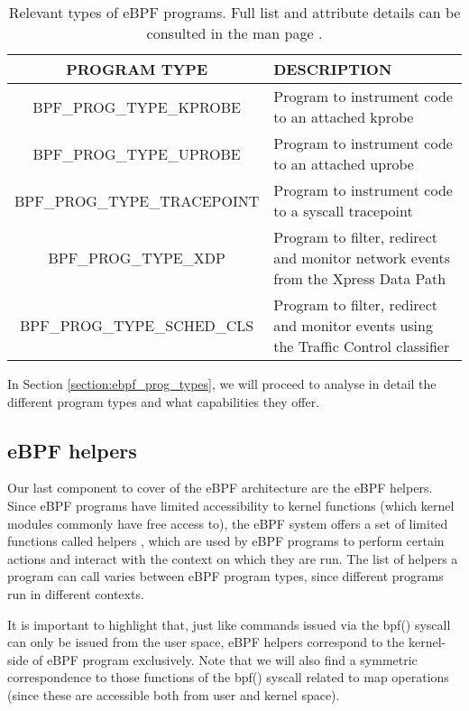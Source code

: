 \begin{table}[htbp]
\begin{tabular}{|c|>{\centering\arraybackslash}p{5cm}|}
\hline
\textbf{PROGRAM TYPE} & \textbf{DESCRIPTION}\\
\hline
\hline
BPF\_PROG\_TYPE\_KPROBE & Program to instrument code to an attached kprobe\\
\hline
BPF\_PROG\_TYPE\_UPROBE & Program to instrument code to an attached uprobe\\
\hline
BPF\_PROG\_TYPE\_TRACEPOINT & Program to instrument code to a syscall tracepoint\\
\hline
BPF\_PROG\_TYPE\_XDP & Program to filter, redirect and monitor network events from the Xpress Data Path\\
\hline
BPF\_PROG\_TYPE\_SCHED\_CLS & Program to filter, redirect and monitor events using the Traffic Control classifier\\
\hline
\end{tabular}
\caption{Relevant types of eBPF programs. Full list and attribute details can be consulted in the man page \cite{bpf_syscall}.}
\label{table:ebpf_prog_types}
\end{table}

In Section \ref{section:ebpf_prog_types}, we will proceed to analyse in detail the different program types and what capabilities they offer.

\subsection{eBPF helpers} \label{subsection:ebpf_helpers}
Our last component to cover of the eBPF architecture are the eBPF helpers. Since eBPF programs have limited accessibility to kernel functions (which kernel modules commonly have free access to), the eBPF system offers a set of limited functions called helpers \cite{ebpf_helpers}, which are used by eBPF programs to perform certain actions and interact with the context on which they are run. The list of helpers a program can call varies between eBPF program types, since different programs run in different contexts.

It is important to highlight that, just like commands issued via the bpf() syscall can only be issued from the user space, eBPF helpers correspond to the kernel-side of eBPF program exclusively. Note that we will also find a symmetric correspondence to those functions of the bpf() syscall related to map operations (since these are accessible both from user and kernel space).

